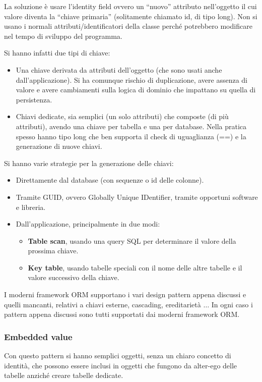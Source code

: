 La soluzione è usare l'identity field ovvero un “nuovo” attributo nell'oggetto
il cui valore diventa la “chiave primaria” (solitamente chiamato id, di tipo long).
Non si usano i normali attributi/identificatori della classe perché potrebbero
modificare nel tempo di sviluppo del programma.

Si hanno infatti due tipi di chiave:
\begin{itemize}
      \item Una chiave derivata da attributi dell'oggetto (che sono usati anche
            dall'applicazione). Si ha comunque rischio di duplicazione, avere
            assenza di valore e avere cambiamenti sulla logica di dominio che
            impattano su quella di persistenza.
      \item Chiavi dedicate, sia semplici (un solo attributi) che composte (di più
            attributi), avendo una chiave per tabella e una per database.
            Nella pratica spesso hanno tipo long che ben supporta il check di
            uguaglianza (==) e la generazione di nuove chiavi.
\end{itemize}
Si hanno varie strategie per la generazione delle chiavi:
\begin{itemize}
      \item Direttamente dal database (con sequenze o id delle colonne).
      \item Tramite GUID, ovvero Globally Unique IDentifier, tramite opportuni
            software e libreria.
      \item Dall'applicazione, principalmente in due modi:
            \begin{itemize}
                  \item \textbf{Table scan}, usando una query SQL per determinare
                        il valore della prossima chiave.
                  \item \textbf{Key table}, usando tabelle speciali con il nome
                        delle altre tabelle e il valore successivo della chiave.
            \end{itemize}
\end{itemize}
I moderni framework ORM supportano i vari design pattern appena discussi e quelli
mancanti, relativi a chiavi esterne, cascading, ereditarietà $\dots$ In ogni caso
i pattern appena discussi sono tutti supportati dai moderni framework ORM.
\subsubsection{Embedded value}
Con questo pattern si hanno semplici oggetti, senza un chiaro concetto di identità,
che possono essere inclusi in oggetti che fungono da alter-ego delle tabelle
anziché creare tabelle dedicate.
